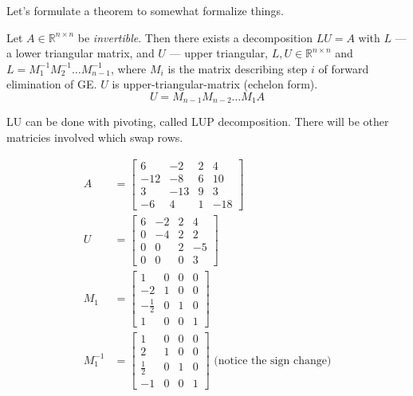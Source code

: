 Let's formulate a theorem to somewhat formalize things.
\begin{theorem}
    Let $A \in \mathbb{R}^{n \times n}$ be \textit{invertible}. Then there exists
    a decomposition $LU = A$ with $L$ --- a lower triangular matrix, and $U$ --- 
    upper triangular, $L, U \in \mathbb{R}^{n \times n}$ and
    $L = M_1^{-1} M_2^{-1} \dots M_{n-1}^{-1}$,
    where $M_i$ is the matrix describing step $i$ of forward elimination of GE.
    $U$ is upper-triangular-matrix (echelon form).
    \[U = M_{n-1} M_{n-2} \dots M_1 A \]
\end{theorem}
\begin{remark}
    LU can be done with pivoting, called LUP decomposition. There will be other matricies
    involved which swap rows.
\end{remark}
\begin{example}
    \begin{align*}
        A &= \begin{bmatrix}
            6 & -2 & 2 & 4\\
            -12 & -8 & 6 & 10\\
            3 & -13 & 9 & 3\\
            -6 & 4 & 1 & -18
        \end{bmatrix}
        \\
        U &= \begin{bmatrix}
            6 & -2 & 2 & 4\\
            0 & -4 & 2 & 2\\
            0 & 0 & 2 & -5\\
            0 & 0 & 0 & 3
        \end{bmatrix}
        \\
        M_1 &= \begin{bmatrix}
            1 & 0 & 0 & 0\\
            -2 & 1 & 0 & 0\\
            -\frac{1}{2} & 0 & 1 & 0\\
            1 & 0 & 0 & 1
        \end{bmatrix}
        \\
        M_1^{-1} &= \begin{bmatrix}
            1 & 0 & 0 & 0\\
            2 & 1 & 0 & 0\\
            \frac{1}{2} & 0 & 1 & 0\\
            -1 & 0 & 0 & 1
        \end{bmatrix} \text{ (notice the sign change)}

\end{align*}
\end{example}

